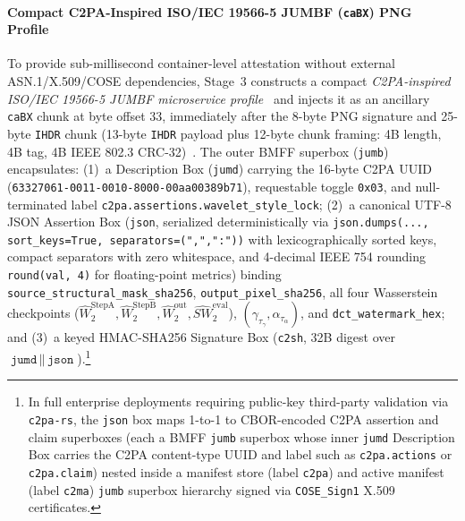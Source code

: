 \documentclass[conference,10pt]{IEEEtran}
\begin{document}
\paragraph{Compact C2PA-Inspired ISO/IEC 19566-5 JUMBF (\texttt{caBX}) PNG Profile}
To provide sub-millisecond container-level attestation without external ASN.1/X.509/COSE dependencies, Stage~3 constructs a compact \emph{C2PA-inspired ISO/IEC 19566-5 JUMBF microservice profile}~\cite{c2pa2024,iso19566} and injects it as an ancillary \texttt{caBX} chunk at byte offset 33, immediately after the 8-byte PNG signature and 25-byte \texttt{IHDR} chunk (13-byte \texttt{IHDR} payload plus 12-byte chunk framing: 4B length, 4B tag, 4B IEEE 802.3 CRC-32)~\cite{iso15948}. The outer BMFF superbox (\texttt{jumb}) encapsulates: (1)~a Description Box (\texttt{jumd}) carrying the 16-byte C2PA UUID (\texttt{63327061-0011-0010-8000-00aa00389b71}), requestable toggle \texttt{0x03}, and null-terminated label \texttt{c2pa.assertions.wavelet\_style\_lock}; (2)~a canonical UTF-8 JSON Assertion Box (\texttt{json}, serialized deterministically via \texttt{json.dumps(..., sort\_keys=True, separators=(",",":"))} with lexicographically sorted keys, compact separators with zero whitespace, and 4-decimal IEEE 754 rounding \texttt{round(val, 4)} for floating-point metrics) binding \texttt{source\_structural\_mask\_sha256}, \texttt{output\_pixel\_sha256}, all four Wasserstein checkpoints ($\widehat{W}_2^{\text{StepA}}, \widehat{W}_2^{\text{StepB}}, \widehat{W}_2^{\text{out}}, \widehat{SW}_2^{\text{eval}}$), $(\gamma_{\tau_\gamma}, \alpha_{\tau_\alpha})$, and \texttt{dct\_watermark\_hex}; and (3)~a keyed HMAC-SHA256 Signature Box (\texttt{c2sh}, 32B digest over $\texttt{jumd} \,\|\, \texttt{json}$).\footnote{In full enterprise deployments requiring public-key third-party validation via \texttt{c2pa-rs}, the \texttt{json} box maps 1-to-1 to CBOR-encoded C2PA assertion and claim superboxes (each a BMFF \texttt{jumb} superbox whose inner \texttt{jumd} Description Box carries the C2PA content-type UUID and label such as \texttt{c2pa.actions} or \texttt{c2pa.claim}) nested inside a manifest store (label \texttt{c2pa}) and active manifest (label \texttt{c2ma}) \texttt{jumb} superbox hierarchy signed via \texttt{COSE\_Sign1} X.509 certificates.}
\end{document}
